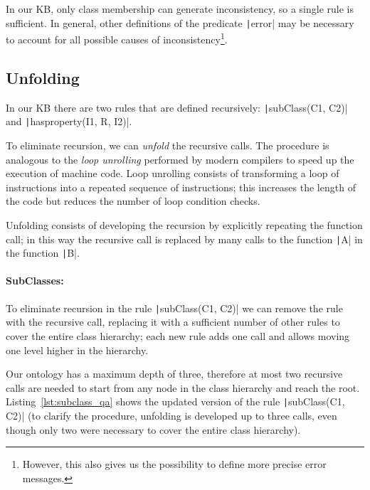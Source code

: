 In our KB, only class membership can generate inconsistency, so a single rule is sufficient. In general, other definitions of the predicate \texttt|error| may be necessary to account for all possible causes of inconsistency\footnote{However, this also gives us the possibility to define more precise error messages.}.

\subsection{Unfolding}
\label{sec:unfold}
In our KB there are two rules that are defined recursively: \texttt|subClass(C1, C2)| and \texttt|hasproperty(I1, R, I2)|. 

To eliminate recursion, we can \emph{unfold} the recursive calls. The procedure is analogous to the \emph{loop unrolling} performed by modern compilers to speed up the execution of machine code. Loop unrolling consists of transforming a loop of instructions into a repeated sequence of instructions; this increases the length of the code but reduces the number of loop condition checks.

Unfolding consists of developing the recursion by explicitly repeating the function call; in this way the recursive call is replaced by many calls to the function \texttt|A| in the function \texttt|B|.

\paragraph{SubClasses:} To eliminate recursion in the rule \texttt|subClass(C1, C2)| we can remove the rule with the recursive call, replacing it with a sufficient number of other rules to cover the entire class hierarchy; each new rule adds one call and allows moving one level higher in the hierarchy.

Our ontology has a maximum depth of three, therefore at most two recursive calls are needed to start from any node in the class hierarchy and reach the root. Listing~\ref{lst:subclass_qa} shows the updated version of the rule \texttt|subClass(C1, C2)| (to clarify the procedure, unfolding is developed up to three calls, even though only two were necessary to cover the entire class hierarchy).

\begin{listingenv}[h]
	\caption{Subclasses unfolding}
	\label{lst:subclass_qa}
\end{listingenv}

